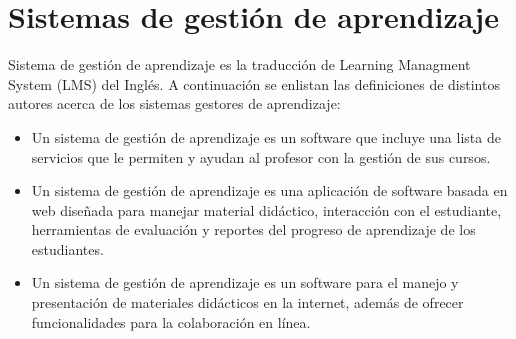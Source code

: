 
\begin{comment}
\section{Elección de Marco de Trabajo}


    Gracias a que Octalysis divide la implementación de la Gamificación en 8 principios, da una flexibilidad mayor en su implementación puesto que se pueden elegir diferentes herramientas para implementar sus principios, a diferencia de los otros autores que solo enumeran las herramientas más usadas (puntos, insignias y tablas de clasificación.) y no dan cabida al uso de otras distintas decidimos utilizar 0ctalysis por las ventajas.
     
     - Modularidad de principios
     - 
     
     
    Que principios se tendrán.
\end{comment}

\section{Sistemas de gestión de aprendizaje}
    Sistema de gestión de aprendizaje es la traducción de Learning Managment System (LMS) del Inglés.
    A continuación se enlistan las definiciones de distintos autores acerca de los sistemas gestores de aprendizaje:
    
    \begin{itemize}
        \item Un sistema de gestión de aprendizaje es un software que incluye  una lista de servicios que le permiten y ayudan al profesor con la gestión de sus cursos. \cite{LMS_1}
        \item  Un sistema de gestión de aprendizaje es una aplicación de software basada en web diseñada para manejar material didáctico, interacción con el estudiante, herramientas de evaluación y reportes del progreso de aprendizaje de los estudiantes. \cite{LMS_2}
        \item  Un sistema de gestión de aprendizaje es un software para el manejo y presentación de materiales didácticos en la internet, además de ofrecer funcionalidades para la colaboración en línea. \cite{LMS_3}
    \end{itemize}

